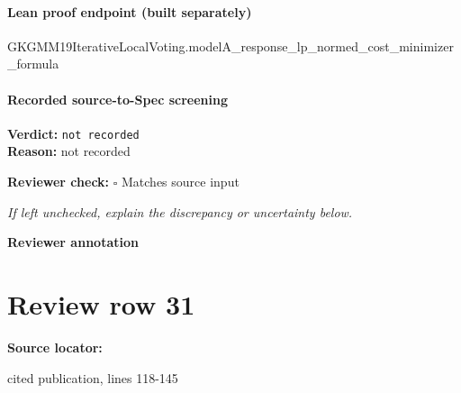 \documentclass[10pt]{article}
\newcommand{\reviewerbox}{%
  \par\noindent\fbox{\parbox{0.96\linewidth}{\rule{0pt}{0.38in}}}\par
}
\newcommand{\reviewmatch}[1]{%
  \par\noindent\textbf{Reviewer check:} $\square$\; #1\par
  \noindent\emph{If left unchecked, explain the discrepancy or uncertainty below.}\par
}
\begin{document}
\paragraph{Lean proof endpoint (built separately)}\begin{ReviewVerbatim}
GKGMM19IterativeLocalVoting.modelA_response_lp_normed_cost_minimizer_formula
\end{ReviewVerbatim}

\paragraph{Recorded source-to-Spec screening}
\textbf{Verdict:} \texttt{not recorded}
\\
\textbf{Reason:} not recorded
\reviewmatch{Matches source input}
\noindent\textbf{Reviewer annotation}\par
\reviewerbox
\clearpage
\hypertarget{source-claim-a9ebc621f1ff8c32}{}
\section*{Review row 31}
\textbf{Source locator:} {\footnotesize\raggedright cited publication, lines 118-\allowbreak{}145\par}
\end{document}
